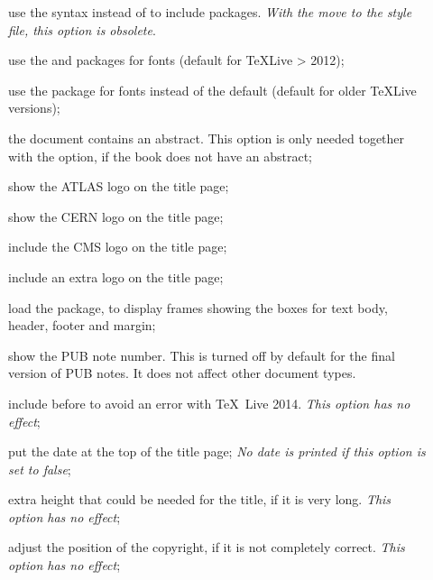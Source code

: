 \begin{description}
\item[] use the syntax 
  instead of  to include packages.
  \emph{ With the move to the  style file, this option is obsolete}.
\item[] use the  and  packages for fonts 
  (default for \TeX Live > 2012);
\item[] use the  package for fonts instead of the default
  (default for older \TeX Live versions);
\item[] the document contains an abstract.
  This option is only needed together with the  option,
  if the book does not have an abstract;
\item[] show the ATLAS logo on the title page;
\item[] show the CERN logo on the title page;
\item[] include the CMS logo on the title page;
\item[] include an extra logo on the title page;
\item[] load the  package, to display frames showing the boxes for text body, header, footer and margin;
\item[] show the PUB note number.
  This is turned off by default for the final version of PUB notes.
  It does not affect other document types.
\item[] include  before  to avoid
  an error with \TeX\ Live 2014.
  \emph{ This option has no effect};
\item[] put the date at the top of the title page;
  \emph{ No date is printed if this option is set to false};
\item[] extra height that could be needed for the title, if it is very long.
  \emph{ This option has no effect};
\item[] adjust the position of the copyright, if it is not completely correct.
  \emph{ This option has no effect};
\end{description}

